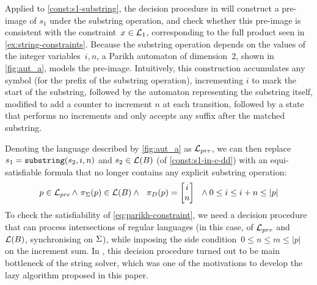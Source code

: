 Applied to \cref{const:s1-substring}, the decision procedure in
\cite{ostrich-plus} will construct a pre-image of $s_1$ under the substring
operation, and check whether this pre-image is consistent with the constraint~$x
\in \operatorname{\mathcal{L}}_1$, corresponding to the full product seen in
\cref{ex:string-constraints}. Because the substring operation depends on the
values of the integer variables~$i, n$, a Parikh automaton of dimension~$2$,
shown in \cref{fig:aut_a}, models the pre-image. Intuitively, this construction
accumulates any symbol (for the prefix of the substring operation), incrementing
$i$ to mark the start of the substring, followed by the automaton representing
the substring itself, modified to add a counter to increment $n$ at each
transition, followed by a state that performs no increments and only accepts any
suffix after the matched substring.

Denoting the language described by \cref{fig:aut_a} as $\operatorname{\mathcal{L}}_{pre}$, we can
then replace $s_1 = \operatorname{\mathtt{substring}}(s_2, i, n)$ and $s_2 \in
\operatorname{\mathcal{L}}(B)$ (of \cref{const:s1-in-c-dd}) with an
equi-satisfiable formula that no longer contains any explicit substring
operation:
%
\begin{equation}
  \label{eq:parikh-constraint}
  p \in \operatorname{\mathcal{L}}_{pre} \wedge~
  \pi_\Sigma(p) \in \operatorname{\mathcal{L}}(B)
  \wedge~~ \pi_D(p) =
  \begin{bmatrix}
    i \\ n
  \end{bmatrix}~~
  \wedge 0 \leq i \leq i + n \leq |p|
\end{equation}
%
To check the satisfiability of \cref{eq:parikh-constraint}, we need a
decision procedure that can process intersections of regular languages
(in this case, of $\operatorname{\mathcal{L}}_{pre}$ and $\operatorname{\mathcal{L}}(B)$, synchronising
on $\Sigma$), while imposing the side
condition~$0 \leq n \leq m \leq |p|$ on the increment sum. In
\cite{ostrich-plus}, this decision procedure turned out to be main
bottleneck of the string solver, which was one of the motivations to
develop the lazy algorithm proposed in this paper.